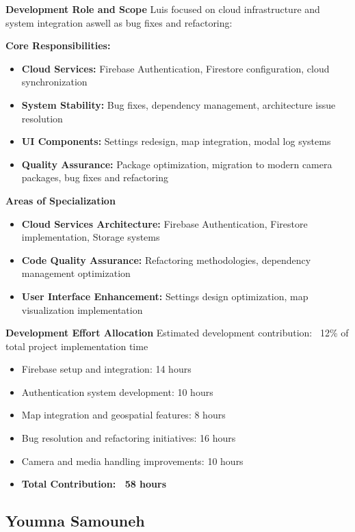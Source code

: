 \textbf{Development Role and Scope}
Luis focused on cloud infrastructure and system integration aswell as bug fixes and refactoring:

\textbf{Core Responsibilities:}
\begin{itemize}
    \item \textbf{Cloud Services:} Firebase Authentication, Firestore configuration, cloud synchronization
    \item \textbf{System Stability:} Bug fixes, dependency management, architecture issue resolution
    \item \textbf{UI Components:} Settings redesign, map integration, modal log systems
    \item \textbf{Quality Assurance:} Package optimization, migration to modern camera packages, bug fixes and refactoring
\end{itemize}

\textbf{Areas of Specialization}
\begin{itemize}
    \item \textbf{Cloud Services Architecture:} Firebase Authentication, Firestore implementation, Storage systems
    \item \textbf{Code Quality Assurance:} Refactoring methodologies, dependency management optimization
    \item \textbf{User Interface Enhancement:} Settings design optimization, map visualization implementation
\end{itemize}

\textbf{Development Effort Allocation}
Estimated development contribution: ~12\% of total project implementation time
\begin{itemize}
    \item Firebase setup and integration: 14 hours
    \item Authentication system development: 10 hours
    \item Map integration and geospatial features: 8 hours
    \item Bug resolution and refactoring initiatives: 16 hours
    \item Camera and media handling improvements: 10 hours
    \item \textbf{Total Contribution: ~58 hours}
\end{itemize}

\subsection{Youmna Samouneh}

